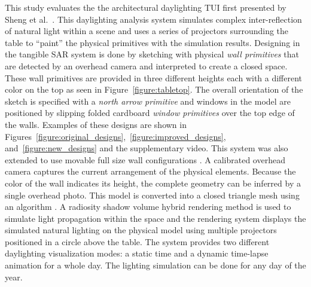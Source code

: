 \documentclass[preprint]{elsarticle}
\begin{document}
This study evaluates the the architectural daylighting TUI first
presented by Sheng et al.~\cite{sheng_TVCG}.  This daylighting analysis
system simulates complex inter-reflection of natural light within a
scene and uses a series of projectors surrounding the table to
``paint'' the physical primitives with the simulation results.
Designing in the tangible SAR system is done by sketching with
physical \emph{wall primitives} that are detected by an overhead
camera and interpreted to create a closed space.  These wall
primitives are provided in three different heights each with a
different color on the top as seen in Figure~\ref{figure:tabletop}.
The overall orientation of the sketch is specified with a \emph{north
  arrow primitive} and windows in the model are positioned by slipping
folded cardboard \emph{window primitives} over the top edge of the
walls.
%
Examples of these designs are shown in
Figures~\ref{figure:original_designs},~\ref{figure:improved_designs},
and~\ref{figure:new_designs} and the supplementary video.  This system
was also extended to use movable full size wall configurations \cite{5543463}.
%
A calibrated overhead camera captures the current arrangement of the
physical elements.  Because the color of the wall indicates its height,  
the complete geometry can be inferred by a single overhead photo.
This model is converted into a closed triangle mesh using an algorithm 
\cite{aag201015}.
A radiosity shadow volume hybrid rendering method \cite{cutler_sheng_aic} is used to simulate light
propagation within the space and the rendering system displays the
simulated natural lighting on the physical model using multiple
projectors positioned in a circle above the table. 
%
%
The system
provides two different daylighting visualization modes: a static time
and a dynamic time-lapse animation for a whole day.  The lighting
simulation can be done for any day of the year.
\end{document}
